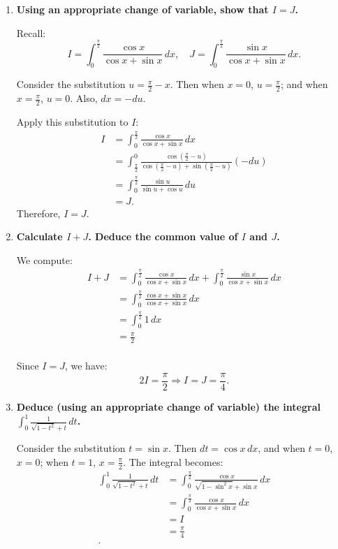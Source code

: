 \documentclass[12pt]{article}
\begin{document}
\begin{answerbox}
  \begin{enumerate}
    \item \textbf{Using an appropriate change of variable, show that $ I = J $.}

    Recall:
    $$
    I = \int_0^{\frac{\pi}{2}} \frac{\cos x}{\cos x + \sin x}\,dx, \quad J = \int_0^{\frac{\pi}{2}} \frac{\sin x}{\cos x + \sin x}\,dx.
    $$

    Consider the substitution $ u = \frac{\pi}{2} - x $. Then when $ x = 0 $, $ u = \frac{\pi}{2} $; and when $ x = \frac{\pi}{2} $, $ u = 0 $. Also, $ dx = -du $.

    Apply this substitution to $ I $:
    $$
    \begin{aligned}
    I & = \int_0^{\frac{\pi}{2}} \frac{\cos x}{\cos x + \sin x}\,dx \\ 
    & = \int_{\frac{\pi}{2}}^{0} \frac{\cos\left(\frac{\pi}{2} - u\right)}{\cos\left(\frac{\pi}{2} - u\right) + \sin\left(\frac{\pi}{2} - u\right)}(-du) \\
    & = \int_0^{\frac{\pi}{2}} \frac{\sin u}{\sin u + \cos u}\,du \\ 
    & = J.
    \end{aligned}
    $$
    Therefore, $ I = J $.

    \item \textbf{Calculate $ I + J $. Deduce the common value of $ I $ and $ J $.}

    We compute:
    $$
    \begin{aligned}
    I + J & = \int_0^{\frac{\pi}{2}} \frac{\cos x}{\cos x + \sin x}\,dx + \int_0^{\frac{\pi}{2}} \frac{\sin x}{\cos x + \sin x}\,dx \\
    & = \int_0^{\frac{\pi}{2}} \frac{\cos x + \sin x}{\cos x + \sin x}\,dx \\
    & = \int_0^{\frac{\pi}{2}} 1\,dx \\
    & = \frac{\pi}{2} \\
    \end{aligned}
    $$

    Since $ I = J $, we have:
    $$
    2I = \frac{\pi}{2} \Rightarrow I = J = \frac{\pi}{4}.
    $$

    \item \textbf{Deduce (using an appropriate change of variable) the integral $ \int_0^1 \frac{1}{\sqrt{1 - t^2} + t}\,dt $.}

    Consider the substitution $ t = \sin x $. Then $ dt = \cos x\,dx $, and when $ t = 0 $, $ x = 0 $; when $ t = 1 $, $ x = \frac{\pi}{2} $. The integral becomes:
    $$
    \begin{aligned}
    \int_0^1 \frac{1}{\sqrt{1 - t^2} + t}\,dt  &= \int_0^{\frac{\pi}{2}} \frac{\cos x}{\sqrt{1 - \sin^2 x} + \sin x}\,dx \\
    &= \int_0^{\frac{\pi}{2}} \frac{\cos x}{\cos x + \sin x}\,dx \\ 
    &= I \\ 
    &= \frac{\pi}{4} \\.
    \end{aligned} 
    $$

\end{enumerate}
\end{answerbox}
\end{document}
